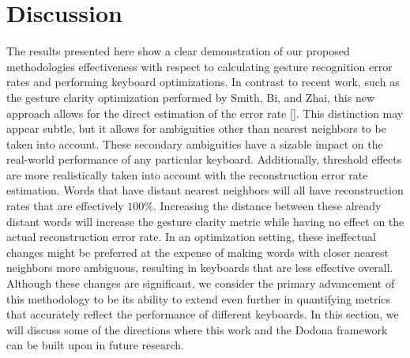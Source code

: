 \documentclass[final,1p,times,authoryear]{elsarticle}
\begin{document}
\section{\textbf{Discussion}}\label{sec:Discussion}
The results presented here show a clear demonstration of our proposed methodologies effectiveness with respect to calculating gesture recognition error rates and performing keyboard optimizations.
In contrast to recent work, such as the gesture clarity optimization performed by Smith, Bi, and Zhai, this new approach allows for the direct estimation of the error rate [\cite{googleKeyboard}].
This distinction may appear subtle, but it allows for ambiguities other than nearest neighbors to be taken into account.
These secondary ambiguities have a sizable impact on the real-world performance of any particular keyboard.
Additionally, threshold effects are more realistically taken into account with the reconstruction error rate estimation.
Words that have distant nearest neighbors will all have reconstruction rates that are effectively $100\%$.
Increasing the distance between these already distant words will increase the gesture clarity metric while having no effect on the actual reconstruction error rate.
In an optimization setting, these ineffectual changes might be preferred at the expense of making words with closer nearest neighbors more ambiguous, resulting in keyboards that are less effective overall.
Although these changes are significant, we consider the primary advancement of this methodology to be its ability to extend even further in quantifying metrics that accurately reflect the performance of different keyboards.
In this section, we will discuss some of the directions where this work and the Dodona framework can be built upon in future research.
\end{document}

